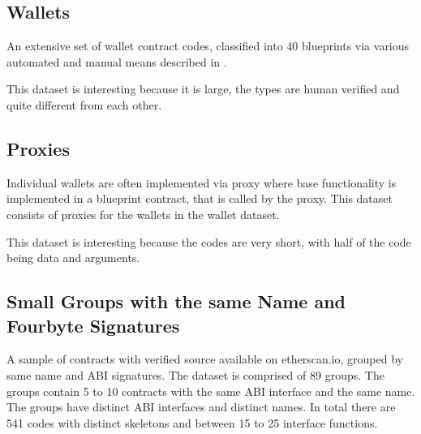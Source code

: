 \documentclass[../main.tex]{subfiles}
\begin{document}
\subsection{Wallets \label{sec:wallets}}
An extensive set of wallet contract codes, classified into 40 blueprints via various automated and manual means described in .

This dataset is interesting because it is large, the types are human verified and quite different from each other.

\subsection{Proxies \label{sec:proxies}}
Individual wallets are often implemented via proxy where base functionality is implemented in a blueprint contract, that is called by the proxy. This dataset consists of proxies for the wallets in the wallet dataset.

This dataset is interesting because the codes are very short, with half of the code being data and arguments.

\subsection{Small Groups with the same Name and Fourbyte Signatures \label{sec:abiGroups}}
A sample of contracts with verified source available on etherscan.io, grouped by same name and ABI signatures. The dataset is comprised of 89 groups. The groups contain 5 to 10 contracts with the same ABI interface and the same name. The groups have distinct ABI interfaces and distinct names.
In total there are 541 codes with distinct skeletons and between 15 to 25 interface functions.
\end{document}
